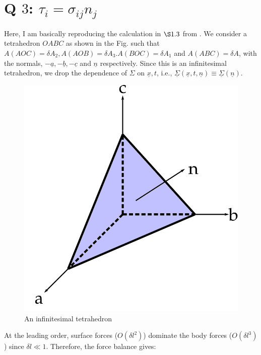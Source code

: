 \documentclass{article}
\begin{document}
\section{Q $3$: $\tau_{i} = \sigma_{ij} n_{j}$}
Here, I am basically reproducing the calculation in $\S 1.3$ from \cite{batchelor2000introduction}. We consider a tetrahedron $OABC$ as shown in the Fig. such that $A(AOC) = \delta A_{2}, A(AOB)=\delta A_{3}. A(BOC) = \delta A_{1}$ and $A(ABC) = \delta A$, with the normals, $-\underline{a}, -\underline{b}, -\underline{c}$ and $\underline{n}$ respectively. Since this is an infinitesimal tetrahedron, we drop the dependence of $\Sigma$ on $\underline{x}, t$, i.e., $ \underline{\Sigma} (\underline{x}, t, \underline{n}) \equiv \underline{\Sigma} (\underline{n})$. 
\begin{figure}[H]
    \centering
    \includegraphics[scale = 0.2]{Figs/tetrahedron.png}
    \caption{An infinitesimal tetrahedron}
    \label{fig:tetrahedron}
\end{figure}

At the leading order, surface forces ($O(\delta l^{2})$) dominate the body forces ($O(\delta l^{3})$) since $\delta l \ll 1$. Therefore, the force balance gives:
\end{document}
